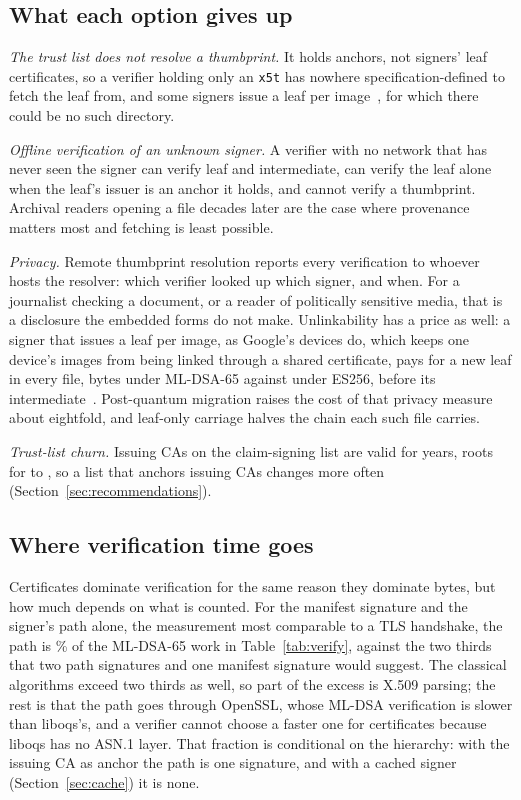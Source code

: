 \subsection{What each option gives up}
\label{sec:tradeoffs}

\emph{The trust list does not resolve a thumbprint.} It holds anchors, not
signers' leaf certificates, so a verifier holding only an \texttt{x5t} has
nowhere specification-defined to fetch the leaf from, and some signers issue
a leaf per image~\cite{google2025pixel}, for which there could be no such
directory.

\emph{Offline verification of an unknown signer.} A verifier with no network
that has never seen the signer can verify leaf and intermediate, can verify
the leaf alone when the leaf's issuer is an anchor it holds, and cannot verify
a thumbprint. Archival readers opening a file decades later are the case where
provenance matters most and fetching is least possible.

\emph{Privacy.} Remote thumbprint resolution reports every verification to
whoever hosts the resolver: which verifier looked up which signer, and when.
For a journalist checking a document, or a reader of politically sensitive
media, that is a disclosure the embedded forms do not make. Unlinkability has
a price as well: a signer that issues a leaf per image, as Google's devices do,
which keeps one device's images from being linked through a shared
certificate, pays for a new leaf in every file, \NleafBytesDSAsixtyfive{} bytes under
ML-DSA-65 against \NleafBytesES{} under ES256, before its
intermediate~\cite{kaye2025privacy}. Post-quantum migration raises the cost of
that privacy measure about eightfold, and leaf-only carriage halves the
chain each such file carries.

\emph{Trust-list churn.} Issuing CAs on the claim-signing list are valid for
\NtlIcaYearsHi{} years, roots for \NtlRootYearsLo{} to \NtlRootYearsHi, so a
list that anchors issuing CAs changes more often
(Section~\ref{sec:recommendations}).

\subsection{Where verification time goes}
\label{sec:verifytime}



Certificates dominate verification for the same reason they dominate bytes,
but how much depends on what is counted. For the manifest signature and the
signer's path alone, the measurement most comparable to a TLS handshake, the
path is \NvPathShareSigDSAsixtyfive\% of the ML-DSA-65 work in
Table~\ref{tab:verify}, against the two thirds that two path signatures and
one manifest signature would suggest. The classical algorithms exceed two
thirds as well, so part of the excess is X.509 parsing; the rest is that the
path goes through OpenSSL, whose ML-DSA verification is slower than liboqs's,
and a verifier cannot choose a faster one for certificates because liboqs has
no ASN.1 layer. That fraction is conditional on the hierarchy: with
the issuing CA as anchor the path is one signature, and with a cached signer
(Section~\ref{sec:cache}) it is none.

